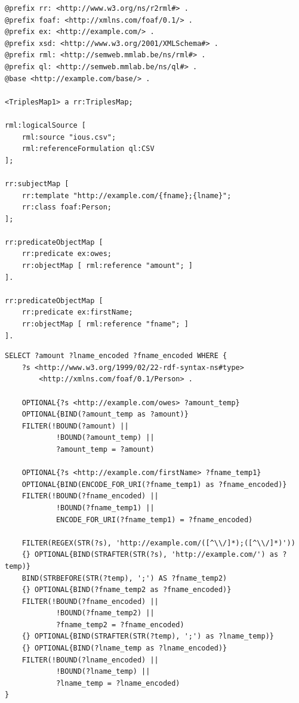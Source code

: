 \begin{lstlisting}[caption={Example mapping rule using all three map types}, label={lst:mapping_rule_all_types}, captionpos=b, basicstyle=\small, frame=single]
@prefix rr: <http://www.w3.org/ns/r2rml#> .
@prefix foaf: <http://xmlns.com/foaf/0.1/> .
@prefix ex: <http://example.com/> .
@prefix xsd: <http://www.w3.org/2001/XMLSchema#> .
@prefix rml: <http://semweb.mmlab.be/ns/rml#> .
@prefix ql: <http://semweb.mmlab.be/ns/ql#> .
@base <http://example.com/base/> .

<TriplesMap1> a rr:TriplesMap;
    
rml:logicalSource [ 
    rml:source "ious.csv";
    rml:referenceFormulation ql:CSV
];

rr:subjectMap [ 
    rr:template "http://example.com/{fname};{lname}";
    rr:class foaf:Person;
];

rr:predicateObjectMap [ 
    rr:predicate ex:owes; 
    rr:objectMap [ rml:reference "amount"; ]
].

rr:predicateObjectMap [ 
    rr:predicate ex:firstName; 
    rr:objectMap [ rml:reference "fname"; ]
].
\end{lstlisting}

\begin{lstlisting}[caption={Generated query for the mapping rule in listing \ref{lst:mapping_rule_all_types}}, label={lst:generated_query}, captionpos=b, basicstyle=\small, frame=single]
SELECT ?amount ?lname_encoded ?fname_encoded WHERE {
    ?s <http://www.w3.org/1999/02/22-rdf-syntax-ns#type> 
        <http://xmlns.com/foaf/0.1/Person> .

    OPTIONAL{?s <http://example.com/owes> ?amount_temp}
    OPTIONAL{BIND(?amount_temp as ?amount)}
    FILTER(!BOUND(?amount) || 
            !BOUND(?amount_temp) || 
            ?amount_temp = ?amount)

    OPTIONAL{?s <http://example.com/firstName> ?fname_temp1}
    OPTIONAL{BIND(ENCODE_FOR_URI(?fname_temp1) as ?fname_encoded)}
    FILTER(!BOUND(?fname_encoded) || 
            !BOUND(?fname_temp1) || 
            ENCODE_FOR_URI(?fname_temp1) = ?fname_encoded)

    FILTER(REGEX(STR(?s), 'http://example.com/([^\\/]*);([^\\/]*)'))
    {} OPTIONAL{BIND(STRAFTER(STR(?s), 'http://example.com/') as ?temp)}
    BIND(STRBEFORE(STR(?temp), ';') AS ?fname_temp2)
    {} OPTIONAL{BIND(?fname_temp2 as ?fname_encoded)}
    FILTER(!BOUND(?fname_encoded) || 
            !BOUND(?fname_temp2) || 
            ?fname_temp2 = ?fname_encoded)
    {} OPTIONAL{BIND(STRAFTER(STR(?temp), ';') as ?lname_temp)}
    {} OPTIONAL{BIND(?lname_temp as ?lname_encoded)}
    FILTER(!BOUND(?lname_encoded) || 
            !BOUND(?lname_temp) || 
            ?lname_temp = ?lname_encoded)
}
\end{lstlisting}

